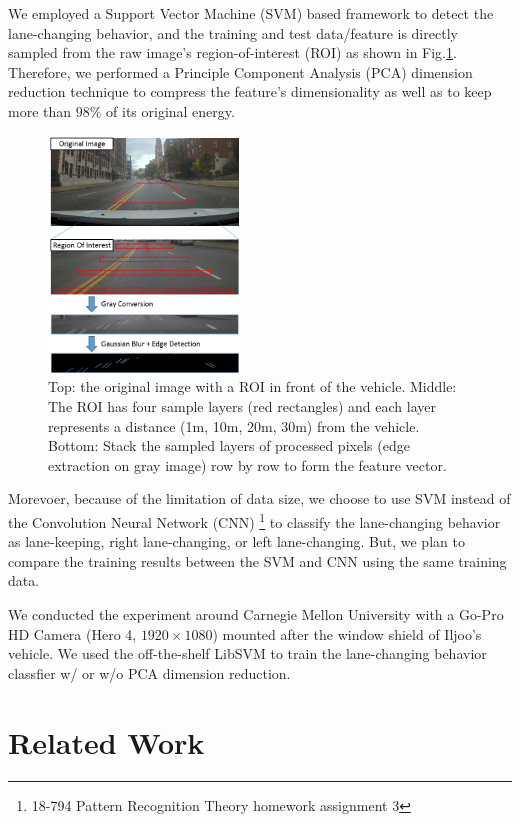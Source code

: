 \documentclass[10pt,twocolumn,letterpaper]{article}
\begin{document}
We employed a Support Vector Machine (SVM) based framework to detect the lane-changing behavior, and the training and test data/feature is directly sampled from the raw image's region-of-interest (ROI) as shown in Fig.\ref{fig:sample}. Therefore, we performed a Principle Component Analysis (PCA) dimension reduction technique to compress the feature's dimensionality as well as to keep more than $98\%$ of its original energy. 

\begin{figure}[t]
	\centering
	\includegraphics[width=0.45\textwidth]{./img/sample.png}
	\caption{Top: the original image with a ROI in front of the vehicle. Middle: The ROI has four sample layers (red rectangles) and each layer represents a distance (1m, 10m, 20m, 30m) from the vehicle. Bottom: Stack the sampled layers of processed pixels (edge extraction on gray image) row by row to form the feature vector.}
	\label{fig:sample}
\end{figure}

Morevoer, because of the limitation of data size, we choose to use SVM instead of the Convolution Neural Network (CNN) \footnote{18-794 Pattern Recognition Theory homework assignment 3} to classify the lane-changing behavior as lane-keeping, right lane-changing, or left lane-changing. But, we plan to compare the training results between the SVM and CNN using the same training data.

We conducted the experiment around Carnegie Mellon University with a Go-Pro HD Camera (Hero 4, $1920 \times 1080$) mounted after the window shield of Iljoo's vehicle. We used the off-the-shelf LibSVM \cite{chang2011libsvm} to train the lane-changing behavior classfier w/ or w/o PCA dimension reduction.

\section{Related Work}
\end{document}
